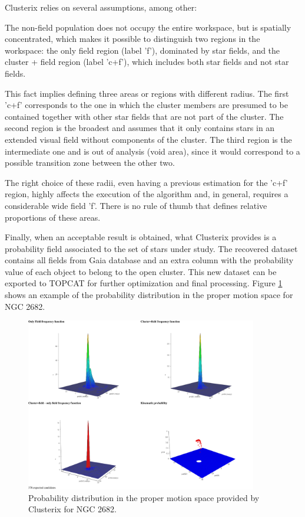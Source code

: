 \documentclass[11pt, a4paper, english]{book}
\begin{document}
Clusterix relies on several assumptions, among other:

\begin{displayquote}
The non-field population does not occupy the entire workspace, but is spatially concentrated,
which makes it possible to distinguish two regions in the workspace:
the only field region (label 'f'), dominated by star fields,
and the cluster + field region (label 'c+f'), which includes both star fields and not star fields.
\cite{balaguer2020clusterix}
\end{displayquote}

This fact implies defining three areas or regions with different radius.
The first 'c+f' corresponds to the one in which the cluster members are
presumed to be contained together with other star fields that are not part of the cluster.
The second region is the broadest and assumes that it only contains stars
in an extended visual field without components of the cluster.
The third region is the intermediate one and is out of analysis (void area),
since it would correspond to a possible transition zone between the other two.

The right choice of these radii, even having a previous estimation for the 'c+f' region,
highly affects the execution of the algorithm and, in general, requires a considerable wide field 'f'.
There is no rule of thumb that defines relative proportions of these areas.

Finally, when an acceptable result is obtained,
what Clusterix provides is a probability field associated to the set of stars under study.
The recovered dataset contains all fields from Gaia database
and an extra column with the probability value of each object to belong to the open cluster.
This new dataset can be exported to TOPCAT for further optimization and final processing.
Figure \ref{fig:clusterix_probability} shows an example of the probability distribution
in the proper motion space for NGC 2682.

\begin{figure}[htbp]
  \centering
  \includegraphics[width=0.9\textwidth]{../figures/clusterix/statistics.pdf}
  \caption{Probability distribution in the proper motion space provided by Clusterix for NGC 2682.}
  \label{fig:clusterix_probability}
\end{figure}
\end{document}
